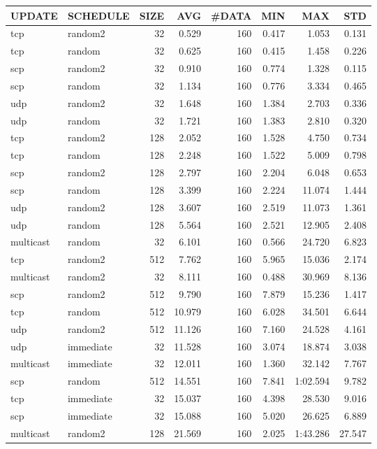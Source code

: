 \begin{tabular}{|l|l|r|r|r|r|r|r|}
\hline
UPDATE & SCHEDULE & SIZE & AVG & \#DATA & MIN & MAX & STD\\
\hline
tcp & random2 & 32 & 0.529 & 160 & 0.417 & 1.053 & 0.131\\
tcp & random & 32 & 0.625 & 160 & 0.415 & 1.458 & 0.226\\
scp & random2 & 32 & 0.910 & 160 & 0.774 & 1.328 & 0.115\\
scp & random & 32 & 1.134 & 160 & 0.776 & 3.334 & 0.465\\
udp & random2 & 32 & 1.648 & 160 & 1.384 & 2.703 & 0.336\\
udp & random & 32 & 1.721 & 160 & 1.383 & 2.810 & 0.320\\
tcp & random2 & 128 & 2.052 & 160 & 1.528 & 4.750 & 0.734\\
tcp & random & 128 & 2.248 & 160 & 1.522 & 5.009 & 0.798\\
scp & random2 & 128 & 2.797 & 160 & 2.204 & 6.048 & 0.653\\
scp & random & 128 & 3.399 & 160 & 2.224 & 11.074 & 1.444\\
udp & random2 & 128 & 3.607 & 160 & 2.519 & 11.073 & 1.361\\
udp & random & 128 & 5.564 & 160 & 2.521 & 12.905 & 2.408\\
multicast & random & 32 & 6.101 & 160 & 0.566 & 24.720 & 6.823\\
tcp & random2 & 512 & 7.762 & 160 & 5.965 & 15.036 & 2.174\\
multicast & random2 & 32 & 8.111 & 160 & 0.488 & 30.969 & 8.136\\
scp & random2 & 512 & 9.790 & 160 & 7.879 & 15.236 & 1.417\\
tcp & random & 512 & 10.979 & 160 & 6.028 & 34.501 & 6.644\\
udp & random2 & 512 & 11.126 & 160 & 7.160 & 24.528 & 4.161\\
udp & immediate & 32 & 11.528 & 160 & 3.074 & 18.874 & 3.038\\
multicast & immediate & 32 & 12.011 & 160 & 1.360 & 32.142 & 7.767\\
scp & random & 512 & 14.551 & 160 & 7.841 & 1:02.594 & 9.782\\
tcp & immediate & 32 & 15.037 & 160 & 4.398 & 28.530 & 9.016\\
scp & immediate & 32 & 15.088 & 160 & 5.020 & 26.625 & 6.889\\
multicast & random2 & 128 & 21.569 & 160 & 2.025 & 1:43.286 & 27.547\\

\end{tabular}
